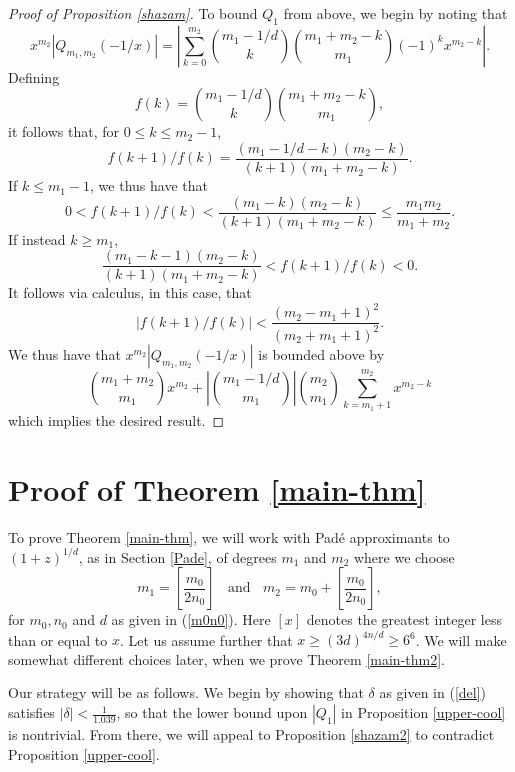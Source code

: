 \begin{proof}[Proof of Proposition \ref{shazam}]
To bound $Q_1$ from above, we begin by noting that
\begin{equation} \label{naslund}
x^{m_2} \left| Q_{m_1,m_2} (-1/x) \right| = \left| \sum_{k=0}^{m_2} \binom{m_1 - 1/d}{k} \binom{m_1+m_2-k}{m_1} (-1)^k x^{m_2-k} \right|.
\end{equation}
Defining
$$
f (k) = \binom{m_1 - 1/d}{k} \binom{m_1+m_2-k}{m_1},
$$
it follows that, for $0 \leq k \leq m_2-1$,
$$
f (k+1)/f(k) = \frac{(m_1 -1/d-k)(m_2-k)}{(k+1)(m_1+m_2-k)}.
$$
If $k \leq m_1-1$, we thus have that
\begin{equation} \label{bound1}
0 < f (k+1)/f(k) < \frac{(m_1 -k)(m_2-k)}{(k+1)(m_1+m_2-k)} \leq \frac{m_1m_2}{m_1+m_2}.
\end{equation}
If instead $k \geq m_1$, 
\begin{equation} \label{bound2}
\frac{(m_1 -k-1)(m_2-k)}{(k+1)(m_1+m_2-k)}  < f (k+1)/f(k) < 0.
\end{equation}
It follows via calculus, in this case, that
$$
|f(k+1)/f(k)| < \frac{(m_2-m_1+1)^2}{(m_2+m_1+1)^2}.
$$
We thus have that $x^{m_2} \left| Q_{m_1,m_2} (-1/x) \right|$ is bounded above by
$$
 \binom{m_1+m_2}{m_1}  x^{m_2} +  \left| \binom{m_1 - 1/d}{m_1} \right| \binom{m_2}{m_1}  \sum_{k=m_1+1}^{m_2}  x^{m_2-k}
$$
which implies the desired result. 
\end{proof}


\section{Proof of Theorem \ref{main-thm} } \label{sec-main-thm}

To prove Theorem \ref{main-thm}, we will work with Pad\'e approximants to $(1+z)^{1/d}$, as in Section \ref{Pade},  of degrees $m_1$ and $m_2$ where we choose
\begin{equation} \label{choice}
m_1 = \left[ \frac{m_0}{2 n_0} \right] \; \; \mbox{ and } \; \; m_2 = m_0 + \left[ \frac{m_0}{2 n_0} \right],
\end{equation}
for $m_0, n_0$ and $d$ as given in (\ref{m0n0}). Here $[x]$ denotes the greatest integer less than or equal to $x$.
Let us assume further that $x \geq (3d)^{4n/d} \geq 6^6$. 
We will make somewhat different choices later, when we prove Theorem \ref{main-thm2}. 

Our strategy will be as follows. We begin by showing that 
 $\delta$ as given in (\ref{del}) satisfies $|\delta| < \frac{1}{1.039}$, so that the lower bound upon $|Q_1|$ in Proposition \ref{upper-cool} is nontrivial. From there, we will appeal to Proposition \ref{shazam2}  to contradict Proposition \ref{upper-cool}.
 
